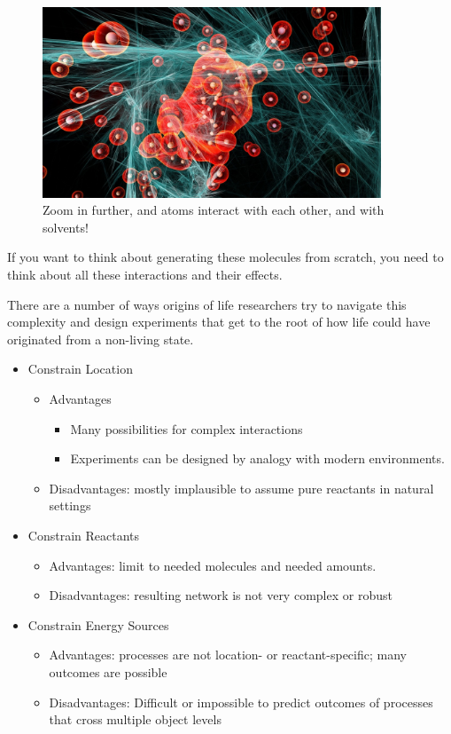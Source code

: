 \documentclass[]{article}
\begin{document}
\begin{figure}[H]
	\caption[Zoom in further, and atoms interact with each other]{Zoom in further, and atoms interact with each other, and with solvents!}\label{fig:MolecularInteractions} 
	\includegraphics[width=0.9\textwidth]{MolecularInteractions}
\end{figure}

If you want to think about generating these molecules from scratch, you need to think about all these interactions and their effects.

There are a number of ways origins of life researchers try to navigate this complexity and design experiments that get to the root of how life could have originated from a non-living state.

\begin{itemize}
	\item Constrain Location 
	\begin{itemize}
		\item Advantages
		\begin{itemize}
			\item Many possibilities for complex interactions
			\item Experiments can be designed by analogy with modern environments.
		\end{itemize}
		\item Disadvantages: mostly implausible to assume pure reactants in natural settings
	\end{itemize}
	\item Constrain Reactants
	\begin{itemize}
		\item Advantages: limit to needed molecules and needed amounts.
		\item Disadvantages: resulting network is not very complex or robust
	\end{itemize}	
	\item Constrain Energy Sources
		\begin{itemize}
		\item Advantages: processes are not location- or reactant-specific; many 		outcomes are possible
		\item Disadvantages: Difficult or impossible to predict outcomes of
		processes that cross multiple object levels
	\end{itemize}
\end{itemize}
\end{document}
